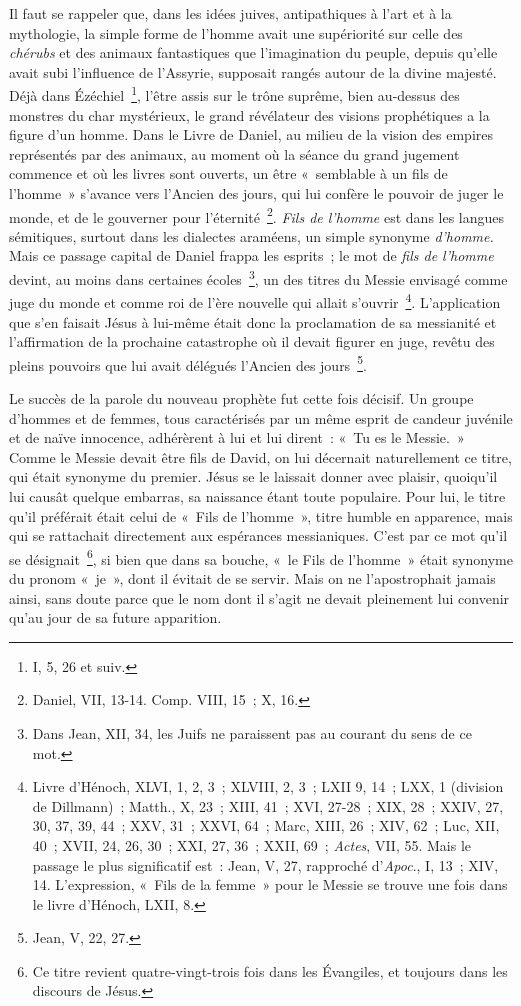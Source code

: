\documentclass[french,twoside]{book} %
\begin{document}
Il faut se rappeler que, dans les idées juives, antipathiques à l’art et à la mythologie, la simple forme de l’homme avait une supériorité sur celle des {\itshape chérubs} et des animaux fantastiques que l’imagination du peuple, depuis qu’elle avait subi l’influence de l’Assyrie, supposait rangés autour de la divine majesté. Déjà dans Ézéchiel \footnote{I, 5, 26 et suiv.}, l’être assis sur le trône suprême, bien au-dessus des monstres du char mystérieux, le grand révélateur des visions prophétiques a la figure d’un homme. Dans le Livre de Daniel, au milieu de la vision des empires représentés par des animaux, au moment où la séance du grand jugement commence et où les livres sont ouverts, un être « semblable à un fils de l’homme » s’avance vers l’Ancien des jours, qui lui confère le pouvoir de juger le monde, et de le gouverner pour l’éternité \footnote{Daniel, VII, 13-14. Comp. VIII, 15 ; X, 16.}. {\itshape Fils de l’homme} est dans les langues sémitiques, surtout dans les dialectes araméens, un simple synonyme {\itshape d’homme.} Mais ce passage capital de Daniel frappa les esprits ; le mot de {\itshape fils de l’homme} devint, au moins dans certaines écoles \footnote{Dans Jean, XII, 34, les Juifs ne paraissent pas au courant du sens de ce mot.}, un des titres du Messie envisagé comme juge du monde et comme roi de l’ère nouvelle qui allait s’ouvrir \footnote{ Livre d’Hénoch, XLVI, 1, 2, 3 ; XLVIII, 2, 3 ; LXII 9, 14 ; LXX, 1 (division de Dillmann) ; Matth., X, 23 ; XIII, 41 ; XVI, 27-28 ; XIX, 28 ; XXIV, 27, 30, 37, 39, 44 ; XXV, 31 ; XXVI, 64 ; Marc, XIII, 26 ; XIV, 62 ; Luc, XII, 40 ; XVII, 24, 26, 30 ; XXI, 27, 36 ; XXII, 69 ; {\itshape Actes}, VII, 55. Mais le passage le plus significatif est : Jean, V, 27, rapproché d’{\itshape Apoc}., I, 13 ; XIV, 14. L’expression, « Fils de la femme » pour le Messie se trouve une fois dans le livre d’Hénoch, LXII, 8.}. L’application que s’en faisait Jésus à lui-même était donc la proclamation de sa messianité et l’affirmation de la prochaine catastrophe où il devait figurer en juge, revêtu des pleins pouvoirs que lui avait délégués l’Ancien des jours \footnote{Jean, V, 22, 27.}.\par
Le succès de la parole du nouveau prophète fut cette fois décisif. Un groupe d’hommes et de femmes, tous caractérisés par un même esprit de candeur juvénile et de naïve innocence, adhérèrent à lui et lui dirent : « Tu es le Messie. » Comme le Messie devait être fils de David, on lui décernait naturellement ce titre, qui était synonyme du premier. Jésus se le laissait donner avec plaisir, quoiqu’il lui causât quelque embarras, sa naissance étant toute populaire. Pour lui, le titre qu’il préférait était celui de « Fils de l’homme », titre humble en apparence, mais qui se rattachait directement aux espérances messianiques. C’est par ce mot qu’il se désignait \footnote{Ce titre revient quatre-vingt-trois fois dans les Évangiles, et toujours dans les discours de Jésus.}, si bien que dans sa bouche, « le Fils de l’homme » était synonyme du pronom « je », dont il évitait de se servir. Mais on ne l’apostrophait jamais ainsi, sans doute parce que le nom dont il s’agit ne devait pleinement lui convenir qu’au jour de sa future apparition.\par
\end{document}

